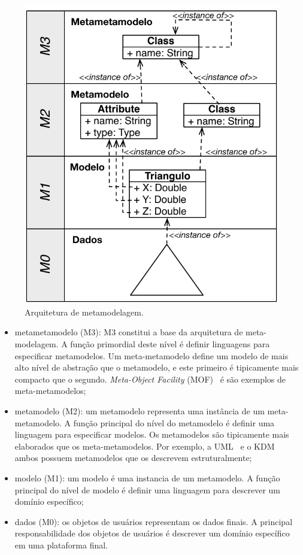 \begin{figure}[htb]
 \caption{Arquitetura de metamodelagem.}
 \label{fig:metamodelosCamadas}
 \centering
 \includegraphics[scale=1]{images/Arquitetura_de_metamodelagem}
 \fautor
\end{figure}

\begin{itemize}
	\item metametamodelo (M3): M3 constitui a base da arquitetura de meta-modelagem. A função primordial deste nível é definir linguagens para especificar metamodelos. Um meta-metamodelo define um modelo de mais alto nível de abstração que o metamodelo, e este primeiro é tipicamente mais compacto que o segundo. \textit{Meta-Object Facility} (MOF)~\cite{MOF} é \cite{EMF} são exemplos de meta-metamodelos;
	\item metamodelo (M2): um metamodelo representa uma instância de um meta-metamodelo. A função principal do nível do metamodelo é definir uma linguagem para especificar modelos. Os metamodelos são tipicamente mais elaborados que os meta-metamodelos. Por exemplo, a UML~\cite{UML:OMG} e o KDM~\cite{KDM:ISO} ambos possuem metamodelos que os descrevem estruturalmente;
	\item modelo (M1): um modelo é uma instancia de um metamodelo. A função principal do nível de modelo é definir uma linguagem para descrever um domínio específico;
	\item dados (M0): os objetos de usuários representam os dados finais. A principal responsabilidade dos objetos de usuários é descrever um domínio específico em uma plataforma final.
\end{itemize}

